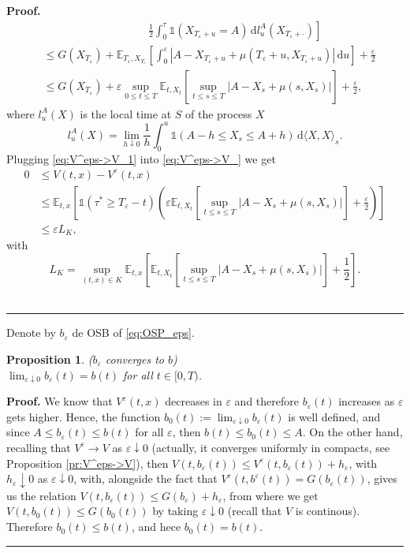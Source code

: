 \documentclass{tufte-handout}
\newcommand{\E}{\mathbb{E}} %
\newcommand{\dif}{\mathrm{d}}
\newtheorem{pr}{Proposition}
\newenvironment{pf}[1][Proof]{\textbf{#1.} }{\ \rule{0.5em}{0.5em}}
\begin{document}
\begin{pf}
\begin{align}
			&\hspace{4cm}\left. \frac{1}{2}\int_{0}^{\tau}\mathbb{1}(X_{T_\varepsilon + u} = A)\,\dif l_u^A(X_{T_\varepsilon + \cdot}) \right] \nonumber \\
			&\leq G(X_{T_\varepsilon}) + \E_{T_\varepsilon, X_{T_\varepsilon}}\left[\int_{0}^{\varepsilon}\left|A - X_{T_\varepsilon + u} + \mu(T_\varepsilon + u, X_{T_\varepsilon + u})\right|\,\dif u\right] + \frac{\varepsilon}{2} \nonumber \\
			&\leq G(X_{T_\varepsilon}) + \varepsilon \sup_{0 \leq t \leq T}\E_{t, X_{t}}\left[\sup_{t \leq s\leq T}\left|A - X_{s} + \mu(s, X_{s})\right|\right] + \frac{\varepsilon}{2}, \label{eq:V^eps->V_1}
		\end{align}		
		where $l_u^A(X)$ is the local time at $S$ of the process $X$
		$$
		l_u^A(X) = \lim_{h\downarrow0}\frac{1}{h}\int_{0}^{u}\mathbb{1}(A - h \leq X_s \leq A + h)\,\dif\langle X, X\rangle_s.
		$$
		Plugging \eqref{eq:V^eps->V_1} into \eqref{eq:V^eps->V_} we get
		\begin{align*}
			0 &\leq V(t, x) - V^\varepsilon(t, x) \nonumber \\
			&\leq \E_{t, x}\left[\mathbb{1}(\tau^* \geq T_\varepsilon - t)\left(\varepsilon \E_{t, X_{t}}\left[\sup_{t \leq s\leq T}\left|A - X_{s} + \mu(s, X_{s})\right|\right] + \frac{\varepsilon}{2}\right)\right] \\
			&\leq \varepsilon L_K,           
		\end{align*}
		with
		$$
		L_K = \sup_{(t, x) \in K}\E_{t, x}\left[\E_{t, X_{t}}\left[\sup_{t \leq s\leq T}\left|A - X_{s} + \mu(s, X_{s})\right|\right] + \frac{1}{2}\right].
		$$
	\end{pf}

	Denote by $b_\varepsilon$ de OSB of \eqref{eq:OSP_eps}.
	\begin{pr}($b_\varepsilon$ converges to $b$) \label{pr:b_eps->b} \\
		$\lim_{\varepsilon\downarrow0}b_\varepsilon(t) = b(t)$ for all $t\in[0, T)$.
	\end{pr}
	\begin{pf}
		We know that $V^\varepsilon(t, x)$ decreases in $\varepsilon$ and therefore $b_\varepsilon(t)$ increases as $\varepsilon$ gets higher. Hence, the function $b_0(t):= \lim_{\varepsilon\downarrow0}b_\varepsilon(t)$ is well defined, and since $A \leq b_\varepsilon(t) \leq b(t)$ for all $\varepsilon$, then $b(t) \leq b_0(t) \leq A$. On the other hand, recalling that $V^\varepsilon \rightarrow V$ as $\varepsilon\downarrow0$ (actually, it converges uniformly in compacts, see Proposition \ref{pr:V^eps->V}), then $V(t, b_\varepsilon(t)) \leq V^\varepsilon(t, b_\varepsilon(t)) + h_\varepsilon$, with $h_\varepsilon \downarrow 0$ as $\varepsilon\downarrow 0$, with, alongside the fact that $V^{\varepsilon}(t, b^\varepsilon(t)) = G(b_\varepsilon(t))$, gives us the relation $V(t, b_\varepsilon(t)) \leq G(b_\varepsilon) + h_\varepsilon$, from where we get $V(t, b_0(t)) \leq G(b_0(t))$ by taking $\varepsilon\downarrow 0$ (recall that $V$ is continous). Therefore $b_0(t) \leq b(t)$, and hece $b_0(t) = b(t)$.      
	\end{pf}
	
\end{document}
